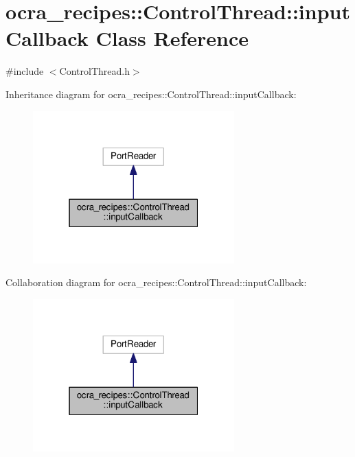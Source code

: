 \hypertarget{classocra__recipes_1_1ControlThread_1_1inputCallback}{}\section{ocra\+\_\+recipes\+:\+:Control\+Thread\+:\+:input\+Callback Class Reference}
\label{classocra__recipes_1_1ControlThread_1_1inputCallback}


{\ttfamily \#include $<$Control\+Thread.\+h$>$}



Inheritance diagram for ocra\+\_\+recipes\+:\+:Control\+Thread\+:\+:input\+Callback\+:
\nopagebreak
\begin{figure}[H]
\begin{center}
\leavevmode
\includegraphics[width=220pt]{dd/dec/classocra__recipes_1_1ControlThread_1_1inputCallback__inherit__graph}
\end{center}
\end{figure}


Collaboration diagram for ocra\+\_\+recipes\+:\+:Control\+Thread\+:\+:input\+Callback\+:
\nopagebreak
\begin{figure}[H]
\begin{center}
\leavevmode
\includegraphics[width=220pt]{d5/d6b/classocra__recipes_1_1ControlThread_1_1inputCallback__coll__graph}
\end{center}
\end{figure}
